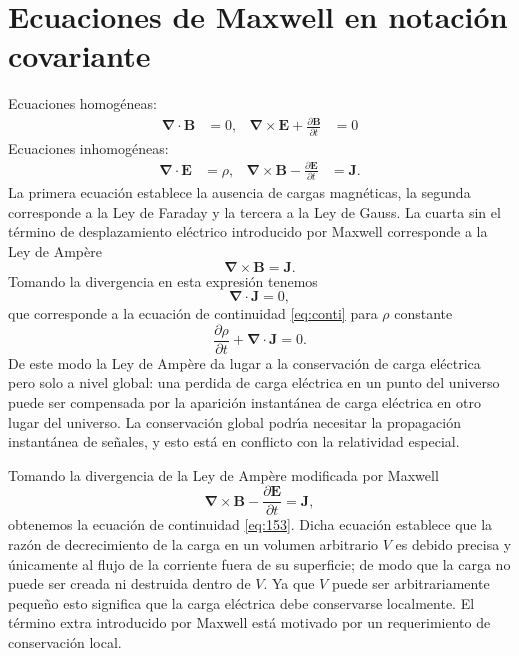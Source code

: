 \section{Ecuaciones de Maxwell en notaci\'on covariante }
\label{sec:maxeqs}
Ecuaciones homog\'eneas:
\begin{align}
  \label{eq:hom_m_eq}
  \boldsymbol{\nabla}\cdot\mathbf{B}&=0,&\boldsymbol{\nabla}\times\mathbf{E}+\frac{\partial\mathbf{B}}{\partial t}&=0
\end{align}
Ecuaciones inhomog\'eneas:
\begin{align}
  \label{eq:inhom_m_eq}
  \boldsymbol{\nabla}\cdot\mathbf{E}&=\rho,&\boldsymbol{\nabla}\times\mathbf{B}-\frac{\partial\mathbf{E}}{\partial t}&=\mathbf{J}.
\end{align}
La primera ecuaci\'on establece la ausencia de cargas magn\'eticas, la segunda corresponde a la Ley de Faraday y la tercera a la Ley de Gauss. La cuarta sin el t\'ermino de desplazamiento el\'ectrico introducido por Maxwell corresponde a la Ley de Amp\`ere
\begin{equation}
   \boldsymbol{\nabla}\times\mathbf{B}=\mathbf{J}.
\end{equation}
Tomando la divergencia en esta expresi\'on tenemos
\begin{equation}
  \boldsymbol{\nabla}\cdot\mathbf{J}=0,
\end{equation}
que corresponde a la ecuaci\'on de continuidad \eqref{eq:conti} para $\rho$ constante
\begin{equation}
  \label{eq:153}
  \frac{\partial \rho}{\partial t}+\boldsymbol{\nabla}\cdot\mathbf{J}=0.
\end{equation}
De este modo la Ley de Amp\`ere da lugar a la conservaci\'on de carga el\'ectrica pero solo a nivel global:  una perdida de carga el\'ectrica en un punto del universo puede ser compensada por la aparici\'on instant\'anea de carga el\'ectrica en otro lugar del universo. La conservaci\'on global podr\'\i a necesitar la propagaci\'on instant\'anea de se\~nales, y esto est\'a en conflicto con la relatividad especial.


Tomando la divergencia de la Ley de Amp\`ere modificada por Maxwell
\begin{equation}
   \boldsymbol{\nabla}\times\mathbf{B}-\frac{\partial\mathbf{E}}{\partial t}=\mathbf{J},
\end{equation}
obtenemos la ecuaci\'on de continuidad \eqref{eq:153}. Dicha ecuaci\'on establece que la raz\'on de decrecimiento de la carga en un volumen arbitrario $V$ es debido precisa y \'unicamente al flujo de la corriente fuera de su superficie; de modo que la carga no puede ser creada ni destruida dentro de $V$.  Ya que $V$ puede ser arbitrariamente peque\~no esto significa que la carga el\'ectrica debe conservarse localmente.   El t\'ermino extra introducido por Maxwell est\'a motivado por un requerimiento de conservaci\'on local. 



